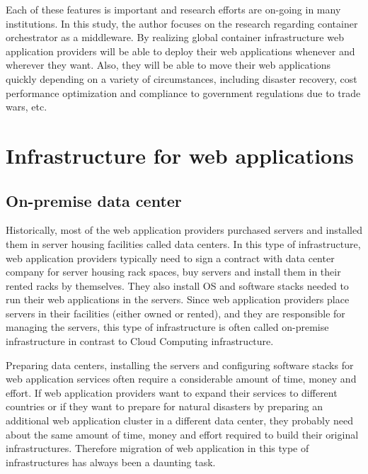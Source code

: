 Each of these features is important\added{,} and research efforts are on-going in many institutions.
In this study, the author focuses on the research regarding container orchestrator as a  middleware.
%
By realizing global container infrastructure web application providers will be able to deploy their web applications whenever and wherever they want.
Also, they will be able to move their web applications quickly depending on a variety of circumstances, including disaster recovery, cost performance optimization\added{,} and compliance to government regulations due to trade wars, etc.


\section{Infrastructure for web applications}

\subsection{On-premise data center}

Historically, most of the web application providers purchased servers and installed them in server housing facilities called data centers.
In this type of infrastructure, web application providers typically need to sign a contract with data center company for server housing rack spaces, buy servers and install them in their rented racks by themselves.
They also install OS and software stacks needed to run their web applications in the servers.
Since web application providers place servers in their facilities (either owned or rented), and they are responsible for managing the servers, this type of infrastructure is often called on-premise infrastructure in contrast to Cloud Computing infrastructure.

Preparing data centers, installing the servers and configuring software stacks for web application services often require a considerable amount of time, money and effort.
If web application providers want to expand their services to different countries or if they want to prepare for natural disasters by preparing an additional web application cluster in a different data center, they probably need about the same amount of time, money and effort required to build their original infrastructures.
Therefore migration of web application in this type of infrastructures has always been a daunting task.

